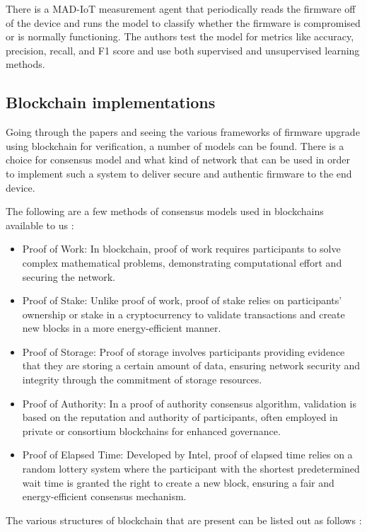 \documentclass{article}
\begin{document}
There is a MAD-IoT measurement agent that periodically reads the firmware off of the device and runs the model to classify whether the firmware is compromised or is normally functioning. The authors test the model for metrics like accuracy, precision, recall, and F1 score and use both supervised and unsupervised learning methods. 

\subsection{Blockchain implementations}
Going through the papers and seeing the various frameworks of firmware upgrade using blockchain for verification, a number of models can be found. There is a choice for consensus model and what kind of network that can be used in order to implement such a system to deliver secure and authentic firmware to the end device.

The following are a few methods of consensus models used in blockchains available to us \cite{adoption}:

\begin{itemize}
    \item Proof of Work: In blockchain, proof of work requires participants to solve complex mathematical problems, demonstrating computational effort and securing the network.
    \item Proof of Stake: Unlike proof of work, proof of stake relies on participants' ownership or stake in a cryptocurrency to validate transactions and create new blocks in a more energy-efficient manner.
    \item Proof of Storage: Proof of storage involves participants providing evidence that they are storing a certain amount of data, ensuring network security and integrity through the commitment of storage resources.
    \item Proof of Authority: In a proof of authority consensus algorithm, validation is based on the reputation and authority of participants, often employed in private or consortium blockchains for enhanced governance.
    \item Proof of Elapsed Time: Developed by Intel, proof of elapsed time relies on a random lottery system where the participant with the shortest predetermined wait time is granted the right to create a new block, ensuring a fair and energy-efficient consensus mechanism.
\end{itemize}

The various structures of blockchain that are present can be listed out as follows \cite{adoption}:
\end{document}
